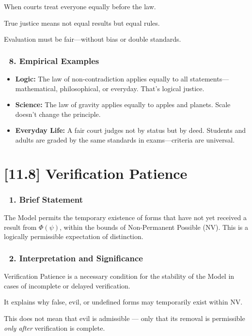 \documentclass[12pt]{article}
\begin{document}
When courts treat everyone equally before the law.

True justice means not equal results but equal rules.

Evaluation must be fair—without bias or double standards.

\subsubsection*{🔹 8. Empirical Examples}

\begin{itemize}
\item \textbf{Logic:} The law of non-contradiction applies equally to all statements—mathematical, philosophical, or everyday. That’s logical justice.
\item \textbf{Science:} The law of gravity applies equally to apples and planets. Scale doesn’t change the principle.
\item \textbf{Everyday Life:} A fair court judges not by status but by deed. Students and adults are graded by the same standards in exams—criteria are universal.
\end{itemize}

\section*{[11.8] Verification Patience}

\subsubsection*{🔹 1. Brief Statement}

The Model permits the temporary existence of forms that have not yet received a result from $\Phi(\psi)$, within the bounds of \text{[4.3]} Non-Permanent Possible (NV). This is a logically permissible expectation of distinction.

\subsubsection*{🔹 2. Interpretation and Significance}

Verification Patience is a necessary condition for the stability of the Model in cases of incomplete or delayed verification.

It explains why false, evil, or undefined forms may temporarily exist within NV.

This does not mean that evil is admissible — only that its removal is permissible \emph{only after} verification is complete.
\end{document}
